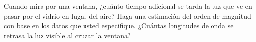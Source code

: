 \item Cuando mira por una ventana, ¿cuánto tiempo adicional se tarda la luz que ve en pasar por el vidrio en lugar del aire? Haga una estimación del orden de magnitud con base en los datos que usted especifique. ¿Cuántas longitudes de onda se retrasa la luz visible al cruzar la ventana?